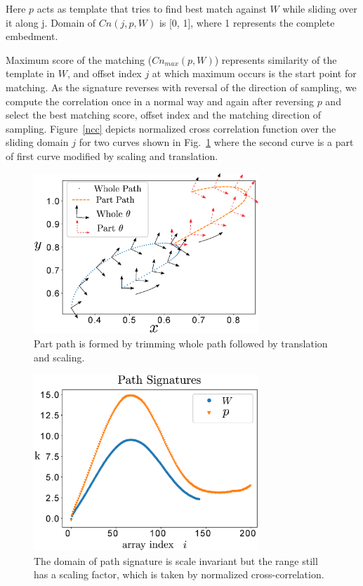 \documentclass[twocolumn,10pt]{asme2e}
\begin{document}
Here $p$ acts as template that tries to find best match against $W$ while sliding over it along j.
Domain of $Cn(j, p, W)$ is [0, 1], where 1 represents the complete embedment.

Maximum score of the matching ($Cn_{max}(p, W)$) represents similarity of the template in $W$, and offset index $j$ at which maximum occurs is the start point for matching.
As the signature reverses with reversal of the direction of sampling, we compute the correlation once in a normal way and again after reversing $p$ and select the best matching score, offset index and the matching direction of sampling.
Figure~\ref{ncc} depicts normalized cross correlation function over the sliding domain $j$ for two curves shown in Fig.~\ref{wholePart} where the second curve is a part of first curve modified by scaling and translation.

\begin{figure}
\centering
\includegraphics[width=240pt]{figure/fig_whole_part.eps}
  \caption{Part path is formed by trimming whole path followed by translation and scaling.}
\label{wholePart}
\end{figure}

\begin{figure}
\centering
\includegraphics[width=240pt]{figure/fig_path_signatures.eps}
  \caption{The domain of path signature is scale invariant but the range still has a scaling factor, which is taken by normalized cross-correlation.}
\label{pathSignature}
\end{figure}
\end{document}
